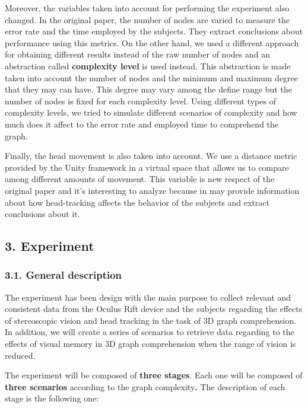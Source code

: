 Moreover, the variables taken into account for performing the experiment
also changed. In the original paper, the number of nodes are varied to
measure the error rate and the time employed by the subjects. They
extract conclusions about performance using this metrics. On the other
hand, we used a different approach for obtaining different results
instead of the raw number of nodes and an abstraction called
\textbf{complexity level} is used instead. This abstraction is made
taken into account the number of nodes and the minimum and maximum
degree that they may can have. This degree may vary among the define
range but the number of nodes is fixed for each complexity level. Using
different types of complexity levels, we tried to simulate different
scenarios of complexity and how much does it affect to the error rate
and employed time to comprehend the graph.

Finally, the head movement is also taken into account. We use a distance
metric provided by the Unity framework in a virtual space that allows us
to compare among different amounts of movement. This variable is new
respect of the original paper and it's interesting to analyze because in
may provide information about how head-tracking affects the behavior of
the subjects and extract conclusions about it.

\subsection{3. Experiment}\label{experiment}

\subsubsection{3.1. General description}\label{general-description}

The experiment has been design with the main purpose to collect relevant
and consistent data from the Oculus Rift device and the subjects
regarding the effects of stereoscopic vision and head tracking in the
task of 3D graph comprehension. In addition, we will create a series of
scenarios to retrieve data regarding to the effects of visual memory in
3D graph comprehension when the range of vision is reduced.

The experiment will be composed of \textbf{three stages}. Each one will
be composed of \textbf{three scenarios} according to the graph
complexity\textbf{.} The description of each stage is the following one:

